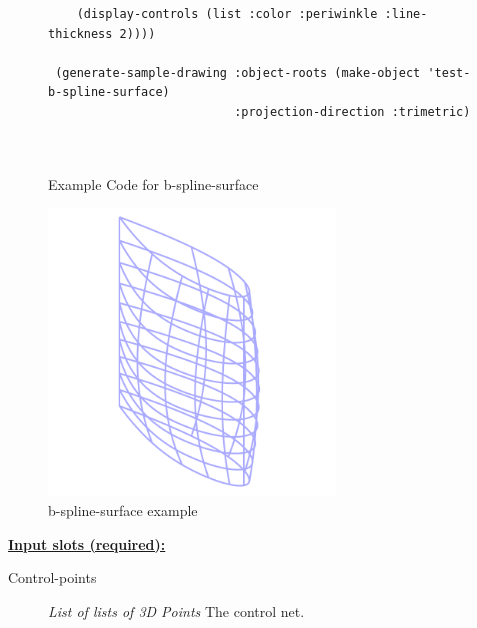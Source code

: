 \documentclass [11pt]{book}
\begin{document}
\begin{itemize}
\begin{figure}
\begin{lrbox}{\boxedverb}
\begin{minipage}{\linewidth}
{\begin{verbatim}
    (display-controls (list :color :periwinkle :line-thickness 2))))
  
 (generate-sample-drawing :object-roots (make-object 'test-b-spline-surface)
                          :projection-direction :trimetric)

 
\end{verbatim}}
\end{minipage}
\end{lrbox}
\fbox{\usebox{\boxedverb}}

\caption{Example Code for b-spline-surface}

\label{fig:example-code-b-spline-surface}

\end{figure}

\begin{figure}
\begin{center}
\includegraphics[width=3in,height=3in]{../images/example-b-spline-surface.pdf}
\end{center}

\caption{b-spline-surface example}

\label{fig:b-spline-surface}

\end{figure}





\textbf{
\underline{Input slots (required):}}

\begin{description}

\item [Control-points]
\emph{List of lists of 3D Points} The control net.


\end{description}







\end{itemize}
\end{document}
